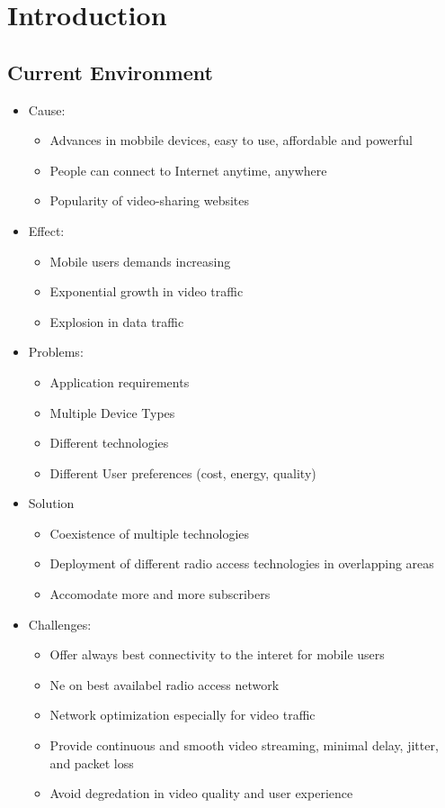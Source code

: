 \documentclass[a4paper]{article}
\begin{document}
\section{Introduction}
\subsection{Current Environment}
\begin{itemize}
	\item Cause:
	\begin{itemize}
		\item Advances in mobbile devices, easy to use, affordable and
			powerful
		\item People can connect to Internet anytime, anywhere
		\item Popularity of video-sharing websites
	\end{itemize}
	\item Effect:
	\begin{itemize}
		\item Mobile users demands increasing
		\item Exponential growth in video traffic
		\item Explosion in data traffic
	\end{itemize}
	\item Problems:
	\begin{itemize}
		\item Application requirements
		\item Multiple Device Types
		\item Different technologies
		\item Different User preferences (cost, energy, quality)
	\end{itemize}
	\item Solution
	\begin{itemize}
		\item Coexistence of multiple technologies
		\item Deployment of different radio access technologies in
			overlapping areas
		\item Accomodate more and more subscribers
	\end{itemize}
	\item Challenges:
	\begin{itemize}
		\item Offer always best connectivity to the interet for mobile
			users
		\item Ne on best availabel radio access network
		\item Network optimization especially for video traffic
		\item Provide continuous and smooth video streaming, minimal
			delay, jitter, and packet loss
		\item Avoid degredation in video quality and user experience
	\end{itemize}
\end{itemize}
\end{document}

